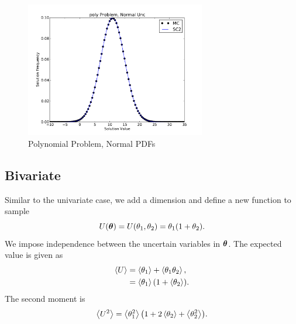 \begin{figure}[H]
\centering
   \includegraphics[width=0.7\textwidth]{../graphics/poly_normal_pdfs}
   \caption{Polynomial Problem, Normal PDFs}
      \label{fig:poly norm}
\end{figure}



\subsection{Bivariate}
Similar to the univariate case, we add a dimension and define a new function to sample
\begin{equation}
U(\vb*{\theta})=U(\theta_1,\theta_2)=\theta_1\qty(1+\theta_2).
\end{equation}
We impose independence between the uncertain variables in $\vb*{\theta}$.
The expected value is given as
\begin{align}
\ev{U}&=\ev{\theta_1}+\ev{\theta_1\theta_2},\\
  &= \ev{\theta_1}\qty(1+\ev{\theta_2}).
\end{align}
The second moment is
\begin{align}
\ev{U^2}=\ev{\theta_1^2}\qty(1+2\ev{\theta_2}+\ev{\theta_2^2}).
\end{align}

